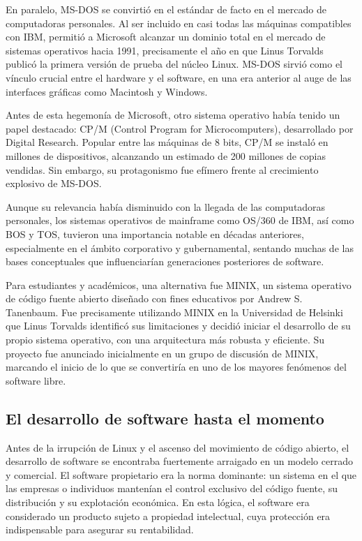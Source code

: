 \documentclass[a4paper,12pt]{article}
\begin{document}
En paralelo, MS-DOS se convirtió en el estándar de facto en el mercado de
computadoras personales. Al ser incluido en casi todas las máquinas compatibles
con IBM, permitió a Microsoft alcanzar un dominio total en el mercado de
sistemas operativos hacia 1991, precisamente el año en que Linus Torvalds
publicó la primera versión de prueba del núcleo Linux. MS-DOS sirvió como el
vínculo crucial entre el hardware y el software, en una era anterior al auge de
las interfaces gráficas como Macintosh y Windows.

Antes de esta hegemonía de Microsoft, otro sistema operativo había tenido un
papel destacado: CP/M (Control Program for Microcomputers), desarrollado por
Digital Research. Popular entre las máquinas de 8 bits, CP/M se instaló en
millones de dispositivos, alcanzando un estimado de 200 millones de copias
vendidas. Sin embargo, su protagonismo fue efímero frente al crecimiento
explosivo de MS-DOS.

Aunque su relevancia había disminuido con la llegada de las
computadoras personales, los sistemas operativos de mainframe como OS/360 de
IBM, así como BOS y TOS, tuvieron una importancia notable en décadas anteriores,
especialmente en el ámbito corporativo y gubernamental, sentando muchas de las
bases conceptuales que influenciarían generaciones posteriores de software.

Para estudiantes y académicos, una alternativa fue MINIX, un sistema operativo
de código fuente abierto diseñado con fines educativos por Andrew S. Tanenbaum.
Fue precisamente utilizando MINIX en la Universidad de Helsinki que Linus
Torvalds identificó sus limitaciones y decidió iniciar el desarrollo de su
propio sistema operativo, con una arquitectura más robusta y eficiente. Su
proyecto fue anunciado inicialmente en un grupo de discusión de MINIX, marcando
el inicio de lo que se convertiría en uno de los mayores fenómenos del software
libre.


\subsection{El desarrollo de software hasta el momento}

Antes de la irrupción de Linux y el ascenso del movimiento de código abierto, el
desarrollo de software se encontraba fuertemente arraigado en un modelo cerrado
y comercial. El software propietario era la norma dominante: un sistema en el
que las empresas o individuos mantenían el control exclusivo del código fuente,
su distribución y su explotación económica. En esta lógica, el software era
considerado un producto sujeto a propiedad intelectual, cuya protección era
indispensable para asegurar su rentabilidad.
\end{document}

